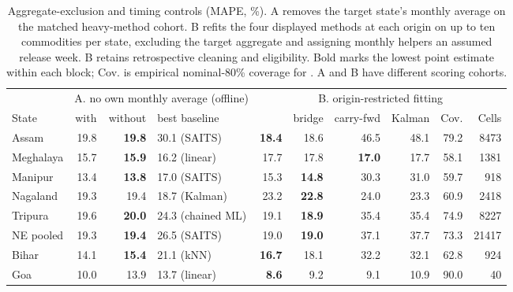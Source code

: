 \begin{table}[t]
\caption{Aggregate-exclusion and timing controls (MAPE, \%). A removes the target state's monthly average on the matched heavy-method cohort. B refits the four displayed methods at each origin on up to ten commodities per state, excluding the target aggregate and assigning monthly helpers an assumed release week. B retains retrospective cleaning and eligibility. Bold marks the lowest point estimate within each block; Cov. is empirical nominal-80\% coverage for \auto{}. A and B have different scoring cohorts.}
\label{tab:controls}
\small
\setlength{\tabcolsep}{4.5pt}
\begin{tabular}{l rrl rrrr rr}
\toprule
 & \multicolumn{3}{c}{A. no own monthly average (offline)} & \multicolumn{6}{c}{B. origin-restricted fitting} \\
\cmidrule(lr){2-4}\cmidrule(lr){5-10}
State & \auto{} with & \auto{} without & best baseline & \auto{} & bridge & carry-fwd & Kalman & Cov. & Cells \\
\midrule
Assam & 19.8 & \textbf{19.8} & 30.1 (SAITS) & \textbf{18.4} & 18.6 & 46.5 & 48.1 & 79.2 & 8473 \\
Meghalaya & 15.7 & \textbf{15.9} & 16.2 (linear) & 17.7 & 17.8 & \textbf{17.0} & 17.7 & 58.1 & 1381 \\
Manipur & 13.4 & \textbf{13.8} & 17.0 (SAITS) & 15.3 & \textbf{14.8} & 30.3 & 31.0 & 59.7 & 918 \\
Nagaland & 19.3 & 19.4 & 18.7 (Kalman) & 23.2 & \textbf{22.8} & 24.0 & 23.3 & 60.9 & 2418 \\
Tripura & 19.6 & \textbf{20.0} & 24.3 (chained ML) & 19.1 & \textbf{18.9} & 35.4 & 35.4 & 74.9 & 8227 \\
NE pooled & 19.3 & \textbf{19.4} & 26.5 (SAITS) & 19.0 & \textbf{19.0} & 37.1 & 37.7 & 73.3 & 21417 \\
\midrule
Bihar & 14.1 & \textbf{15.4} & 21.1 (kNN) & \textbf{16.7} & 18.1 & 32.2 & 32.1 & 62.8 & 924 \\
Goa & 10.0 & 13.9 & 13.7 (linear) & \textbf{8.6} & 9.2 & 9.1 & 10.9 & 90.0 & 40 \\
\bottomrule
\end{tabular}
\end{table}
